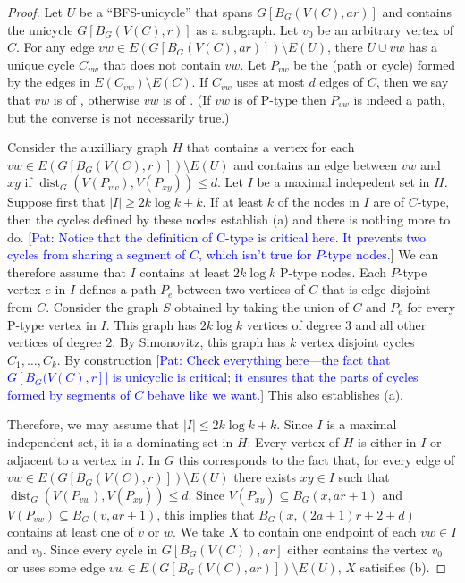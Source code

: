 \documentclass{patmorin}
\newcommand{\pat}[1]{\textcolor{Blue}{Pat: #1}}
\DeclareMathOperator{\dist}{dist}
\begin{document}
\begin{proof}
    Let $U$ be a ``BFS-unicycle'' that spans $G[B_G(V(C),ar)]$ and contains the unicycle $G[B_G(V(C),r)]$ as a subgraph.  Let $v_0$ be an arbitrary vertex of $C$. For any edge $vw\in E(G[B_G(V(C),ar)])\setminus E(U)$, there $U\cup vw$ has a unique cycle $C_{vw}$ that does not contain $vw$. Let $P_{vw}$ be the (path or cycle) formed by the edges in $E(C_{vw})\setminus E(C)$.  If $C_{vw}$ uses at most $d$ edges of $C$, then we say that $vw$ is of , otherwise $vw$ is of .  (If $vw$ is of P-type then $P_{vw}$ is indeed a path, but the converse is not necessarily true.)

    Consider the auxilliary graph $H$ that contains a vertex for each $vw\in E(G[B_G(V(C),r)])\setminus E(U)$ and contains an edge between $vw$ and $xy$ if $\dist_G(V(P_{vw}),V(P_{xy})) \le d$.  Let $I$ be a maximal indepedent set in $H$.  Suppose first that $|I|\ge 2k\log k+k$.  If at least $k$ of the nodes in $I$ are of $C$-type, then the cycles defined by these nodes establish (a) and there is nothing more to do. [\pat{Notice that the definition of C-type is critical here. It prevents two cycles from sharing a segment of $C$, which isn't true for $P$-type nodes.}]  We can therefore assume that $I$ contains at least $2k\log k$ P-type nodes.  Each $P$-type vertex $e$ in $I$ defines a path $P_e$ between two vertices of $C$ that is edge disjoint from $C$.  Consider the graph $S$ obtained by taking the union of $C$ and $P_e$ for every P-type vertex in $I$.  This graph has $2k\log k$ vertices of degree $3$ and all other vertices of degree $2$.  By Simonovitz, this graph has $k$ vertex disjoint cycles $C_1,\ldots,C_k$.  By construction [\pat{Check everything here---the fact that $G[B_G(V(C),r]]$ is unicyclic is critical; it ensures that the parts of cycles formed by segments of $C$ behave like we want.}]  This also establishes (a).

    Therefore, we may assume that $|I|\le 2k\log k+k$.  Since $I$ is a maximal independent set, it is a dominating set in $H$: Every vertex of $H$ is either in $I$ or adjacent to a vertex in $I$.  In $G$ this corresponds to the fact that, for every edge of $vw\in E(G[B_G(V(C),r)])\setminus E(U)$ there exists $xy\in I$ such that $\dist_G(V(P_{vw}),V(P_{xy}))\le d$.  Since $V(P_{xy})\subseteq B_G(x,ar+1)$ and $V(P_{vw})\subseteq B_G(v,ar+1)$, this implies that $B_G(x,(2a+1)r+2+d)$ contains at least one of $v$ or $w$.  We take $X$ to contain one endpoint of each $vw\in I$ and $v_0$.  Since every cycle in $G[B_G(V(C)),ar]$ either contains the vertex $v_0$ or uses some edge $vw\in E(G[B_G(V(C),ar)])\setminus E(U)$, $X$ satisifies (b).
\end{proof}
\end{document}
